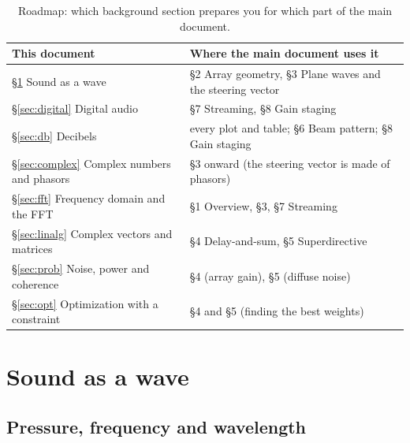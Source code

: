 \documentclass[11pt]{article}
\begin{document}
\begin{table}[ht]
\centering\small
\begin{tabular}{@{}ll@{}}
\toprule
This document & Where the main document uses it\\
\midrule
\S\ref{sec:waves} Sound as a wave & \S2 Array geometry, \S3 Plane waves and the steering vector\\
\S\ref{sec:digital} Digital audio & \S7 Streaming, \S8 Gain staging\\
\S\ref{sec:db} Decibels & every plot and table; \S6 Beam pattern; \S8 Gain staging\\
\S\ref{sec:complex} Complex numbers and phasors & \S3 onward (the steering vector is made of phasors)\\
\S\ref{sec:fft} Frequency domain and the FFT & \S1 Overview, \S3, \S7 Streaming\\
\S\ref{sec:linalg} Complex vectors and matrices & \S4 Delay-and-sum, \S5 Superdirective\\
\S\ref{sec:prob} Noise, power and coherence & \S4 (array gain), \S5 (diffuse noise)\\
\S\ref{sec:opt} Optimization with a constraint & \S4 and \S5 (finding the best weights)\\
\bottomrule
\end{tabular}
\caption{Roadmap: which background section prepares you for which part of the main document.}
\end{table}
\FloatBarrier

\section{Sound as a wave}\label{sec:waves}

\subsection{Pressure, frequency and wavelength}
\end{document}
